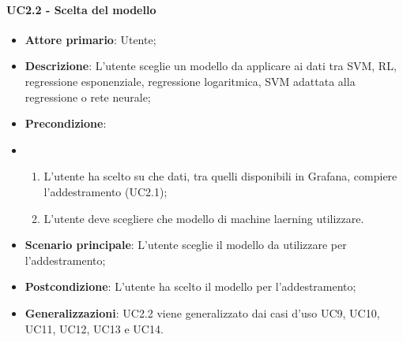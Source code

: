 \paragraph{UC2.2 - Scelta del modello}
\label{para:uc2.2}
\begin{itemize}
  \item \textbf{Attore primario}: Utente;
  \item \textbf{Descrizione}: L'utente sceglie un modello da applicare ai dati tra SVM, RL, regressione esponenziale, regressione logaritmica, SVM adattata alla regressione o rete neurale;
  \item \textbf{Precondizione}:
  \item \begin{enumerate}
    \item L'utente ha scelto su che dati, tra quelli disponibili in Grafana, compiere l'addestramento (UC2.1);
    \item L'utente deve scegliere che modello di machine laerning utilizzare.
  \end{enumerate}
  \item \textbf{Scenario principale}: L'utente sceglie il modello da utilizzare per l'addestramento;
  \item \textbf{Postcondizione}: L'utente ha scelto il modello per l'addestramento;
  \item \textbf{Generalizzazioni}: UC2.2 viene generalizzato dai casi d'uso UC9, UC10, UC11, UC12, UC13 e UC14.
\end{itemize}

